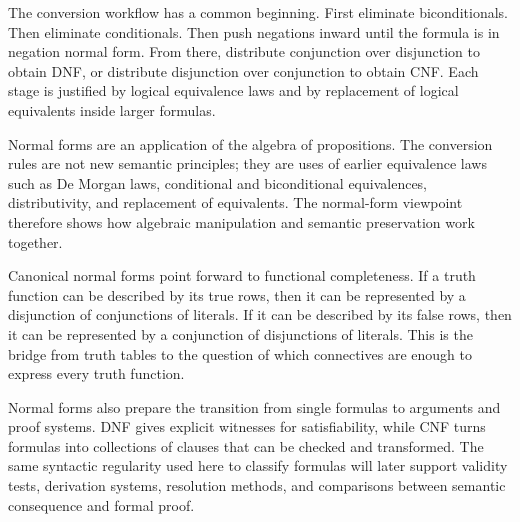 \begin{remark*}
The conversion workflow has a common beginning. First eliminate
biconditionals. Then eliminate conditionals. Then push negations inward until
the formula is in negation normal form. From there, distribute conjunction over
disjunction to obtain DNF, or distribute disjunction over conjunction to obtain
CNF. Each stage is justified by logical equivalence laws and by replacement of
logical equivalents inside larger formulas.
\end{remark*}

\begin{remark*}
Normal forms are an application of the algebra of propositions. The conversion
rules are not new semantic principles; they are uses of earlier equivalence
laws such as De Morgan laws, conditional and biconditional equivalences,
distributivity, and replacement of equivalents. The normal-form viewpoint
therefore shows how algebraic manipulation and semantic preservation work
together.
\end{remark*}

\begin{remark*}
Canonical normal forms point forward to functional completeness. If a truth
function can be described by its true rows, then it can be represented by a
disjunction of conjunctions of literals. If it can be described by its false
rows, then it can be represented by a conjunction of disjunctions of literals.
This is the bridge from truth tables to the question of which connectives are
enough to express every truth function.
\end{remark*}

\begin{remark*}
Normal forms also prepare the transition from single formulas to arguments and
proof systems. DNF gives explicit witnesses for satisfiability, while CNF turns
formulas into collections of clauses that can be checked and transformed. The
same syntactic regularity used here to classify formulas will later support
validity tests, derivation systems, resolution methods, and comparisons between
semantic consequence and formal proof.
\end{remark*}
